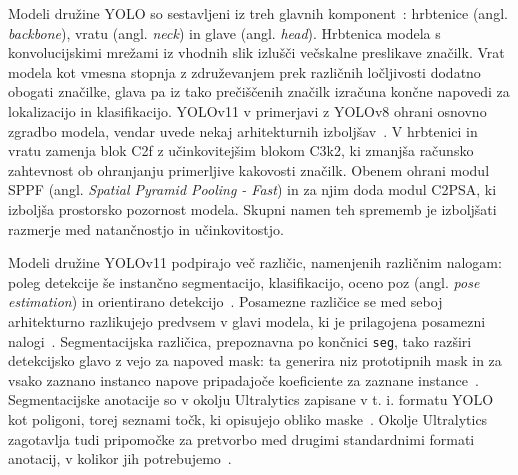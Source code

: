 \documentclass[a4paper,twoside,openright,12pt,slovene]{book}
\begin{document}
        Modeli družine YOLO so sestavljeni iz treh glavnih komponent~\cite{src:khanam2024yolov11}: hrbtenice (angl. \textit{backbone}), vratu (angl. \textit{neck}) in glave (angl. \textit{head}). Hrbtenica modela s konvolucijskimi mrežami iz vhodnih slik izlušči večskalne preslikave značilk. Vrat modela kot vmesna stopnja z združevanjem prek različnih ločljivosti dodatno obogati značilke, glava pa iz tako prečiščenih značilk izračuna končne napovedi za lokalizacijo in klasifikacijo.
        YOLOv11 v primerjavi z YOLOv8 ohrani osnovno zgradbo modela, vendar uvede nekaj arhitekturnih izboljšav~\cite{src:khanam2024yolov11, src:yolov11}. V hrbtenici in vratu zamenja blok C2f z učinkovitejšim blokom C3k2, ki zmanjša računsko zahtevnost ob ohranjanju primerljive kakovosti značilk. Obenem ohrani modul SPPF (angl. \textit{Spatial Pyramid Pooling - Fast}) in za njim doda modul C2PSA, ki izboljša prostorsko pozornost modela. Skupni namen teh sprememb je izboljšati razmerje med natančnostjo in učinkovitostjo.

        Modeli družine YOLOv11 podpirajo več različic, namenjenih različnim nalogam: poleg detekcije še instančno segmentacijo, klasifikacijo, oceno poz (angl. \textit{pose estimation}) in orientirano detekcijo~\cite{src:yolov11, src:khanam2024yolov11}.
        Posamezne različice se med seboj arhitekturno razlikujejo predvsem v glavi modela, ki je prilagojena posamezni nalogi~\cite{src:ultralyticsyolov11-docs}.%
        Segmentacijska različica, prepoznavna po končnici \verb|seg|, tako razširi detekcijsko glavo z vejo za napoved mask: ta generira niz prototipnih mask in za vsako zaznano instanco napove pripadajoče koeficiente za zaznane instance~\cite{src:ultralyticsyolov11-docs}. %
        Segmentacijske anotacije so v okolju Ultralytics zapisane v t. i. formatu YOLO kot poligoni, torej seznami točk, ki opisujejo obliko maske~\cite{src:ultralyticsyolov11, src:ultralyticsyolov11-docs}. Okolje Ultralytics zagotavlja tudi pripomočke za pretvorbo med drugimi standardnimi formati anotacij, v kolikor jih potrebujemo~\cite{src:ultralyticsyolov11-docs}. %
\end{document}
